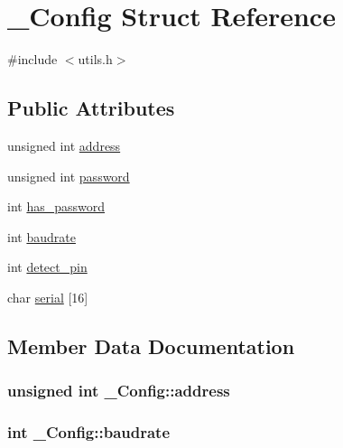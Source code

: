 \hypertarget{struct___config}{}\section{\+\_\+\+Config Struct Reference}
\label{struct___config}


{\ttfamily \#include $<$utils.\+h$>$}

\subsection*{Public Attributes}
\begin{DoxyCompactItemize}
\item 
unsigned int \hyperlink{struct___config_ac134b6321687331193ec33788f16ea79}{address}
\item 
unsigned int \hyperlink{struct___config_a73b3e7f3be7abbdd862dff7ef3a4f071}{password}
\item 
int \hyperlink{struct___config_a13cb1dcf7be8b47adf6e093469b3ec00}{has\+\_\+password}
\item 
int \hyperlink{struct___config_a6e071b5f8b9df2b15af820eebc1738e4}{baudrate}
\item 
int \hyperlink{struct___config_adb2b21077bd3ab6634ef2e9a8742f0de}{detect\+\_\+pin}
\item 
char \hyperlink{struct___config_a84c4d0ac029c3a60e53390a06b062eb4}{serial} \mbox{[}16\mbox{]}
\end{DoxyCompactItemize}


\subsection{Member Data Documentation}
\hypertarget{struct___config_ac134b6321687331193ec33788f16ea79}{}
\subsubsection[{address}]{\setlength{\rightskip}{0pt plus 5cm}unsigned int \+\_\+\+Config\+::address}\label{struct___config_ac134b6321687331193ec33788f16ea79}
\hypertarget{struct___config_a6e071b5f8b9df2b15af820eebc1738e4}{}
\subsubsection[{baudrate}]{\setlength{\rightskip}{0pt plus 5cm}int \+\_\+\+Config\+::baudrate}\label{struct___config_a6e071b5f8b9df2b15af820eebc1738e4}
\hypertarget{struct___config_adb2b21077bd3ab6634ef2e9a8742f0de}{}
